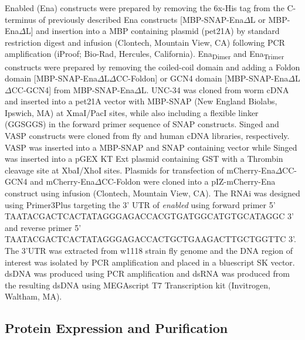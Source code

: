 Enabled (Ena) constructs were prepared by removing the 6x-His tag from the C-terminus of previously described Ena constructs [MBP-SNAP-Ena$\Delta$L or MBP-Ena$\Delta$L] \citep{winkelman_ena/vasp_2014} and insertion into a MBP containing plasmid (pet21A) by standard restriction digest and infusion (Clontech, Mountain View, CA) following PCR amplification (iProof; Bio-Rad, Hercules, California). Ena\textsubscript{Dimer} and Ena\textsubscript{Trimer} constructs were prepared by removing the coiled-coil domain and adding a Foldon domain \citep{guthe_very_2004,papanikolopoulou_formation_2004} [MBP-SNAP-Ena$\Delta$L$\Delta$CC-Foldon] or GCN4 domain \citep{harbury_switch_1993} [MBP-SNAP-Ena$\Delta$L$\Delta$CC-GCN4] from MBP-SNAP-Ena$\Delta$L. UNC-34 was cloned from worm cDNA and inserted into a pet21A vector with MBP-SNAP (New England Biolabs, Ipswich, MA) at XmaI/PacI sites, while also including a flexible linker (GGSGGS) in the forward primer sequence of SNAP constructs. Singed and VASP constructs were cloned from fly and human cDNA libraries, respectively. VASP was inserted into a MBP-SNAP and SNAP containing vector while Singed was inserted into a pGEX KT Ext plasmid containing GST with a Thrombin cleavage site at XbaI/XhoI sites. Plasmids for transfection of mCherry-Ena$\Delta$CC-GCN4 and mCherry-Ena$\Delta$CC-Foldon were cloned into a pIZ-mCherry-Ena \citep{bilancia_enabled_2014} construct using infusion (Clontech, Mountain View, CA). The RNAi was designed using Primer3Plus \citep{untergasser_primer3new_2012} targeting the 3' UTR of \textit{enabled} using forward primer 5' TAATACGACTCACTATAGGGAGACCACGTGATGGCATGTGCATAGGC 3' and reverse primer 5' TAATACGACTCACTATAGGGAGACCACTGCTGAAGACTTGCTGGTTC 3'. The 3'UTR was extracted from w1118 strain fly genome and the DNA region of interest was isolated by PCR amplification and placed in a bluescript SK vector. dsDNA was produced using PCR amplification and dsRNA was produced from the resulting dsDNA using MEGAscript T7 Transcription kit (Invitrogen, Waltham, MA).

\subsection{Protein Expression and Purification}\label{ena-mm-protein-purification}

